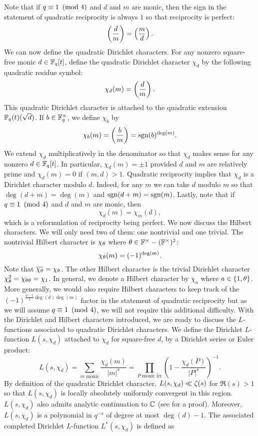 \documentclass[12pt,reqno,oneside]{amsart}
\begin{document}
    Note that if $q \equiv 1 \ \left(\text{mod }4\right)$ and $d$ and $m$ are monic, then the sign in the statement of quadratic reciprocity is always $1$ so that reciprocity is perfect:
    \[
        \left(\frac{d}{m}\right) = \left(\frac{m}{d}\right).
    \]
    We can now define the quadratic Dirichlet characters. For any nonzero square-free monic $d \in \mathbb{F}_{q}[t]$, define the quadratic Dirichlet character $\chi_{d}$ by the following quadratic residue symbol:
    \[
        \chi_{d}(m) = \left(\frac{d}{m}\right).
    \]
    This quadratic Dirichlet character is attached to the quadratic extension $\mathbb{F}_{q}(t)(\sqrt{d})$. If $b \in \mathbb{F}_{q}^{\times}$, we define $\chi_{b}$ by
    \[
        \chi_{b}(m) = \left(\frac{b}{m}\right) = \operatorname{\mathrm{sgn}}(b)^{\deg(m)}.
    \]
    We extend $\chi_{d}$ multiplicatively in the denominator so that $\chi_{d}$ makes sense for any nonzero $d \in \mathbb{F}_{q}[t]$. In particular, $\chi_{d}(m) = \pm1$ provided $d$ and $m$ are relatively prime and $\chi_{d}(m) = 0$ if $(m,d) > 1$. Quadratic reciprocity implies that $\chi_{d}$ is a Dirichlet character modulo $d$. Indeed, for any $m$ we can take $d$ modulo $m$ so that $\deg(d+m) = \deg(m)$ and $\operatorname{\mathrm{sgn}}(d+m) = \operatorname{\mathrm{sgn}}(m)$. Lastly, note that if $q \equiv 1 \ \left(\text{mod }4\right)$ and $d$ and $m$ are monic, then
    \[
        \chi_{d}(m) = \chi_{m}(d),
    \]
    which is a reformulation of reciprocity being perfect. We now discuss the Hilbert characters. We will only need two of them: one nontrivial and one trivial. The nontrivial Hilbert character is $\chi_{\theta}$ where $\theta \in \mathbb{F}^{\times}-(\mathbb{F}^{\times})^{2}$:
    \[
        \chi_{\theta}(m) = (-1)^{\deg(m)}.
    \]
    Note that $\overline{\chi_{\theta}} = \chi_{\theta}$. The other Hilbert character is the trivial Dirichlet character $\chi_{\theta}^{2} = \chi_{\theta\theta} = \chi_{1}$. In general, we denote a Hilbert character by $\chi_{a}$ where $a \in \{1,\theta\}$. More generally, we would also require Hilbert characters to keep track of the $(-1)^{\frac{q-1}{2}\deg(d)\deg(m)}$ factor in the statement of quadratic reciprocity but as we will assume $q \equiv 1 \ \left(\text{mod }4\right)$, we will not require this additional difficulty. With the Dirichlet and Hilbert characters introduced, we are ready to discuss the $L$-functions associated to quadratic Dirichlet characters. We define the Dirichlet $L$-function $L(s,\chi_{d})$ attached to $\chi_{d}$ for square-free $d$, by a Dirichlet series or Euler product:
    \[
        L(s,\chi_{d}) = \sum_{\text{$m$ monic}}\frac{\chi_{d}(m)}{|m|^{s}} = \prod_{\text{$P$ monic irr}}\left(1-\frac{\chi_{d}(P)}{|P|^{s}}\right)^{-1}.
    \]
    By definition of the quadratic Dirichlet character, $L(s,\chi_{d}) \ll \zeta(s)$ for $\Re(s) > 1$ so that $L(s,\chi_{d})$ is locally absolutely uniformly convergent in this region. $L(s,\chi_{d})$ also admits analytic continuation to $\mathbb{C}$ (see \cite{rosen2002number} for a proof). Moreover, $L(s,\chi_{d})$ is a polynomial in $q^{-s}$ of degree at most $\deg(d)-1$. The associated completed Dirichlet $L$-function $L^{\ast}(s,\chi_{d})$ is defined as
\end{document}
